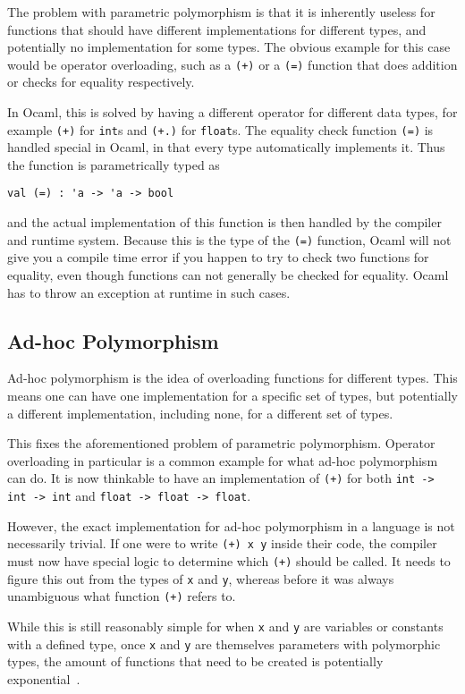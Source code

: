The problem with parametric polymorphism is that it is inherently useless for functions that should have different implementations for different types, and potentially no implementation for some types. The obvious example for this case would be operator overloading, such as a \verb|(+)| or a \verb|(=)| function that does addition or checks for equality respectively.

In Ocaml, this is solved by having a different operator for different data types, for example \verb|(+)| for \verb|int|s and \verb|(+.)| for \verb|float|s. The equality check function \verb|(=)| is handled special in Ocaml, in that every type automatically implements it. Thus the function is parametrically typed as
\begin{verbatim}
val (=) : 'a -> 'a -> bool
\end{verbatim}
and the actual implementation of this function is then handled by the compiler and runtime system. Because this is the type of the \verb|(=)| function, Ocaml will not give you a compile time error if you happen to try to check two functions for equality, even though functions can not generally be checked for equality. Ocaml has to throw an exception at runtime in such cases.

\subsection{Ad-hoc Polymorphism}

Ad-hoc polymorphism is the idea of overloading functions for different types. This means one can have one implementation for a specific set of types, but potentially a different implementation, including none, for a different set of types.

This fixes the aforementioned problem of parametric polymorphism. Operator overloading in particular is a common example for what ad-hoc polymorphism can do. It is now thinkable to have an implementation of \verb|(+)| for both \verb|int -> int -> int| and \verb|float -> float -> float|.

However, the exact implementation for ad-hoc polymorphism in a language is not necessarily trivial. If one were to write \verb|(+) x y| inside their code, the compiler must now have special logic to determine which \verb|(+)| should be called. It needs to figure this out from the types of \verb|x| and \verb|y|, whereas before it was always unambiguous what function \verb|(+)| refers to.

While this is still reasonably simple for when \verb|x| and \verb|y| are variables or constants with a defined type, once \verb|x| and \verb|y| are themselves parameters with polymorphic types, the amount of functions that need to be created is potentially exponential~\cite{type-classes-original}.

